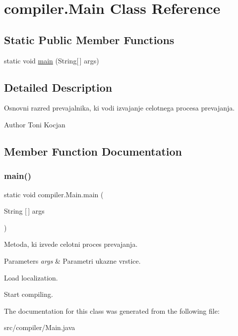 \hypertarget{classcompiler_1_1_main}{}\section{compiler.\+Main Class Reference}
\label{classcompiler_1_1_main}
\subsection*{Static Public Member Functions}
\begin{DoxyCompactItemize}
\item 
static void \hyperlink{classcompiler_1_1_main_a2307b35086da52f0e60d91cd75e6e36c}{main} (String\mbox{[}$\,$\mbox{]} args)
\end{DoxyCompactItemize}


\subsection{Detailed Description}
Osnovni razred prevajalnika, ki vodi izvajanje celotnega procesa prevajanja.

\begin{DoxyAuthor}{Author}
Toni Kocjan 
\end{DoxyAuthor}


\subsection{Member Function Documentation}
\mbox{\label{classcompiler_1_1_main_a2307b35086da52f0e60d91cd75e6e36c}} 
\subsubsection{\texorpdfstring{main()}{main()}}
{\footnotesize\ttfamily static void compiler.\+Main.\+main (\begin{DoxyParamCaption}\item[{String \mbox{[}$\,$\mbox{]}}]{args }\end{DoxyParamCaption})\hspace{0.3cm}{\ttfamily [static]}}

Metoda, ki izvede celotni proces prevajanja.


\begin{DoxyParams}{Parameters}
{\em args} & Parametri ukazne vrstice. \\
\hline
\end{DoxyParams}
Load localization.

Start compiling.

The documentation for this class was generated from the following file\+:\begin{DoxyCompactItemize}
\item 
src/compiler/Main.\+java\end{DoxyCompactItemize}
